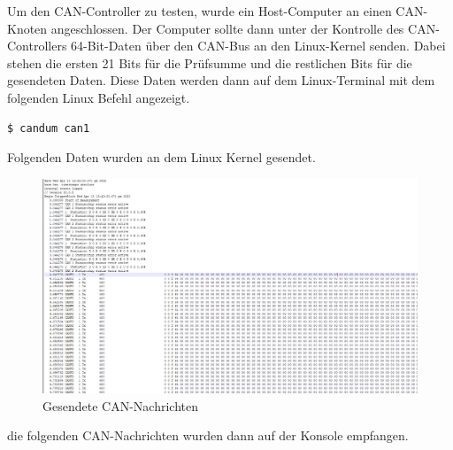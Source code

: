 Um den CAN-Controller zu testen, wurde ein Host-Computer an einen CAN-Knoten angeschlossen. Der Computer sollte dann unter der Kontrolle des CAN-Controllers 64-Bit-Daten über den CAN-Bus an den Linux-Kernel senden. Dabei stehen die ersten 21 Bits für die Prüfsumme und die restlichen Bits für die gesendeten Daten. Diese Daten werden dann auf dem Linux-Terminal mit dem folgenden Linux Befehl angezeigt. 

\begin{lstlisting}[language=bash]
	$ candum can1
\end{lstlisting}

Folgenden Daten wurden an dem Linux Kernel gesendet. 

\begin{figure}[H]
	\begin{center}		\includegraphics[width=1\textwidth]{./images/can_daten.jpg}
	\end{center}
	\vspace{-5pt}
	\caption[Gesendete CAN-Nachrichten]{Gesendete CAN-Nachrichten} %
	\label{fig:gesendete:can:nachrichten}
	\vspace{-5pt}
\end{figure}

die folgenden CAN-Nachrichten wurden dann auf der Konsole empfangen. 

